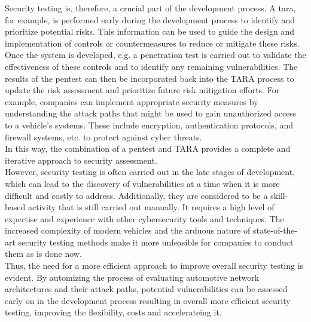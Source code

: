 Security testing is, therefore, a crucial part of the development process.
A \gls{tara}, for example, is performed early during the development process to identify and prioritize potential risks.
This information can be used to guide the design and implementation of controls or countermeasures to reduce or mitigate these risks.
Once the system is developed, e.g. a penetration test is carried out to validate the effectiveness of these controls and to identify any remaining vulnerabilities. 
The results of the pentest can then be incorporated back into the TARA process to update the risk assessment and prioritize future risk mitigation efforts. 
For example, companies can implement appropriate security measures by understanding the attack paths that might be used to gain unauthorized access to a vehicle's systems. 
These include encryption, authentication protocols, and firewall systems, etc. to protect against cyber threats.\\
In this way, the combination of a pentest and TARA provides a complete and iterative approach to security assessment.\\
However, security testing is often carried out in the late stages of development, which can lead to the discovery of vulnerabilities at a time when it is more difficult and costly to address.
Additionally, they are considered to be a skill-based activity that is still carried out manually.
It requires a high level of expertise and experience with other cybersecurity tools and techniques. 
The increased complexity of modern vehicles and the arduous nature of state-of-the-art security testing methods make it more unfeasible for companies to conduct them as is done now.\\
Thus, the need for a more efficient approach to improve overall security testing is evident. 
By automizing the process of evaluating automotive network architectures and their attack paths, 
potential vulnerabilities can be assessed early on in the development process resulting in overall more efficient security testing, improving the flexibility, costs and accelerateing it.\\

